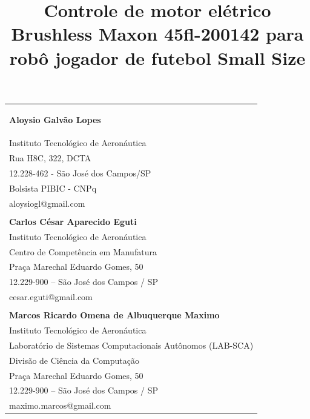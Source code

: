 \documentclass[10pt,fleqn,a4paper]{article}
\begin{document}
    
	{
	}
    \thispagestyle{firststyle}
    \vspace{-.5cm}
    \hspace{-.8cm}
    \begin{tabular}{p{\textwidth}}
    \begin{center}
    \vspace{-.6cm}
    \title{Controle de motor elétrico Brushless Maxon 45fl-200142 para robô jogador de futebol Small Size}
    \end{center}
    \textbf{Aloysio Galvão Lopes}\\
    \small{Instituto Tecnológico de Aeronáutica}\\
    \small{Rua H8C, 322, DCTA}\\
    \small{12.228-462 - São José dos Campos/SP}\\
    \small{Bolsista PIBIC - CNPq}\\
    \small{aloysiogl@gmail.com}\\
    \\ 
    \textbf{Carlos César Aparecido Eguti}\\
    \small{Instituto Tecnológico de Aeronáutica}\\
    \small{Centro de Competência em Manufatura}\\
    \small{Praça Marechal Eduardo Gomes, 50}\\
    \small{12.229-900 – São José dos Campos / SP}\\
    \small{cesar.eguti@gmail.com}\\
    \\ 
    \textbf{Marcos Ricardo Omena de Albuquerque Maximo}\\
    \small{Instituto Tecnológico de Aeronáutica}\\
    \small{Laboratório de Sistemas Computacionais Autônomos (LAB-SCA)}\\
    \small{Divisão de Ciência da Computação}\\
    \small{Praça Marechal Eduardo Gomes, 50}\\
    \small{12.229-900 – São José dos Campos / SP}\\
    \small{maximo.marcos@gmail.com}\\

\end{tabular}
\end{document}
